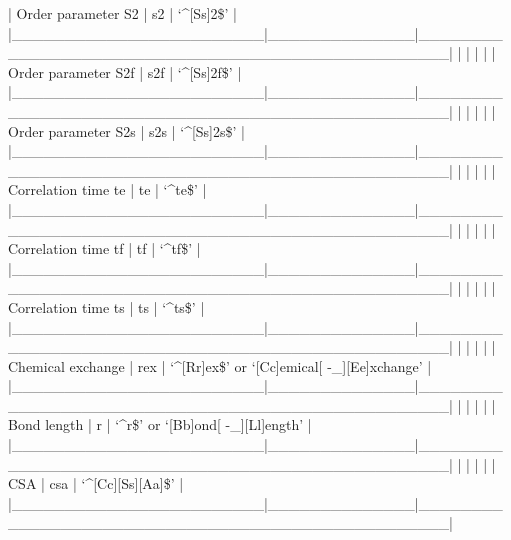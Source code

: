 | Order parameter S2     | s2           | `\^{}[Ss]2\$'                                        |
|\_\_\_\_\_\_\_\_\_\_\_\_\_\_\_\_\_\_\_\_\_\_\_\_|\_\_\_\_\_\_\_\_\_\_\_\_\_\_|\_\_\_\_\_\_\_\_\_\_\_\_\_\_\_\_\_\_\_\_\_\_\_\_\_\_\_\_\_\_\_\_\_\_\_\_\_\_\_\_\_\_\_\_\_\_\_\_\_\_|
|                        |              |                                                  |
| Order parameter S2f    | s2f          | `\^{}[Ss]2f\$'                                       |
|\_\_\_\_\_\_\_\_\_\_\_\_\_\_\_\_\_\_\_\_\_\_\_\_|\_\_\_\_\_\_\_\_\_\_\_\_\_\_|\_\_\_\_\_\_\_\_\_\_\_\_\_\_\_\_\_\_\_\_\_\_\_\_\_\_\_\_\_\_\_\_\_\_\_\_\_\_\_\_\_\_\_\_\_\_\_\_\_\_|
|                        |              |                                                  |
| Order parameter S2s    | s2s          | `\^{}[Ss]2s\$'                                       |
|\_\_\_\_\_\_\_\_\_\_\_\_\_\_\_\_\_\_\_\_\_\_\_\_|\_\_\_\_\_\_\_\_\_\_\_\_\_\_|\_\_\_\_\_\_\_\_\_\_\_\_\_\_\_\_\_\_\_\_\_\_\_\_\_\_\_\_\_\_\_\_\_\_\_\_\_\_\_\_\_\_\_\_\_\_\_\_\_\_|
|                        |              |                                                  |
| Correlation time te    | te           | `\^{}te\$'                                           |
|\_\_\_\_\_\_\_\_\_\_\_\_\_\_\_\_\_\_\_\_\_\_\_\_|\_\_\_\_\_\_\_\_\_\_\_\_\_\_|\_\_\_\_\_\_\_\_\_\_\_\_\_\_\_\_\_\_\_\_\_\_\_\_\_\_\_\_\_\_\_\_\_\_\_\_\_\_\_\_\_\_\_\_\_\_\_\_\_\_|
|                        |              |                                                  |
| Correlation time tf    | tf           | `\^{}tf\$'                                           |
|\_\_\_\_\_\_\_\_\_\_\_\_\_\_\_\_\_\_\_\_\_\_\_\_|\_\_\_\_\_\_\_\_\_\_\_\_\_\_|\_\_\_\_\_\_\_\_\_\_\_\_\_\_\_\_\_\_\_\_\_\_\_\_\_\_\_\_\_\_\_\_\_\_\_\_\_\_\_\_\_\_\_\_\_\_\_\_\_\_|
|                        |              |                                                  |
| Correlation time ts    | ts           | `\^{}ts\$'                                           |
|\_\_\_\_\_\_\_\_\_\_\_\_\_\_\_\_\_\_\_\_\_\_\_\_|\_\_\_\_\_\_\_\_\_\_\_\_\_\_|\_\_\_\_\_\_\_\_\_\_\_\_\_\_\_\_\_\_\_\_\_\_\_\_\_\_\_\_\_\_\_\_\_\_\_\_\_\_\_\_\_\_\_\_\_\_\_\_\_\_|
|                        |              |                                                  |
| Chemical exchange      | rex          | `\^{}[Rr]ex\$' or `[Cc]emical[ -\_][Ee]xchange'       |
|\_\_\_\_\_\_\_\_\_\_\_\_\_\_\_\_\_\_\_\_\_\_\_\_|\_\_\_\_\_\_\_\_\_\_\_\_\_\_|\_\_\_\_\_\_\_\_\_\_\_\_\_\_\_\_\_\_\_\_\_\_\_\_\_\_\_\_\_\_\_\_\_\_\_\_\_\_\_\_\_\_\_\_\_\_\_\_\_\_|
|                        |              |                                                  |
| Bond length            | r            | `\^{}r\$' or `[Bb]ond[ -\_][Ll]ength'                 |
|\_\_\_\_\_\_\_\_\_\_\_\_\_\_\_\_\_\_\_\_\_\_\_\_|\_\_\_\_\_\_\_\_\_\_\_\_\_\_|\_\_\_\_\_\_\_\_\_\_\_\_\_\_\_\_\_\_\_\_\_\_\_\_\_\_\_\_\_\_\_\_\_\_\_\_\_\_\_\_\_\_\_\_\_\_\_\_\_\_|
|                        |              |                                                  |
| CSA                    | csa          | `\^{}[Cc][Ss][Aa]\$'                                 |
|\_\_\_\_\_\_\_\_\_\_\_\_\_\_\_\_\_\_\_\_\_\_\_\_|\_\_\_\_\_\_\_\_\_\_\_\_\_\_|\_\_\_\_\_\_\_\_\_\_\_\_\_\_\_\_\_\_\_\_\_\_\_\_\_\_\_\_\_\_\_\_\_\_\_\_\_\_\_\_\_\_\_\_\_\_\_\_\_\_|



